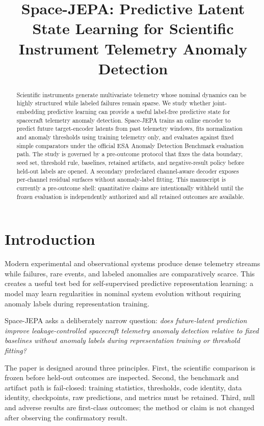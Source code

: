 \documentclass[conference]{IEEEtran}
\title{Space-JEPA: Predictive Latent State Learning for Scientific Instrument Telemetry Anomaly Detection}
\author{\IEEEauthorblockN{Anonymous Authors}}
\begin{document}
\maketitle

\begin{abstract}
Scientific instruments generate multivariate telemetry whose nominal dynamics can be highly structured while labeled failures remain sparse. We study whether joint-embedding predictive learning can provide a useful label-free predictive state for spacecraft telemetry anomaly detection. Space-JEPA trains an online encoder to predict future target-encoder latents from past telemetry windows, fits normalization and anomaly thresholds using training telemetry only, and evaluates against fixed simple comparators under the official ESA Anomaly Detection Benchmark evaluation path. The study is governed by a pre-outcome protocol that fixes the data boundary, seed set, threshold rule, baselines, retained artifacts, and negative-result policy before held-out labels are opened. A secondary predeclared channel-aware decoder exposes per-channel residual surfaces without anomaly-label fitting. This manuscript is currently a pre-outcome shell: quantitative claims are intentionally withheld until the frozen evaluation is independently authorized and all retained outcomes are available.
\end{abstract}

\section{Introduction}
Modern experimental and observational systems produce dense telemetry streams while failures, rare events, and labeled anomalies are comparatively scarce. This creates a useful test bed for self-supervised predictive representation learning: a model may learn regularities in nominal system evolution without requiring anomaly labels during representation training.

Space-JEPA asks a deliberately narrow question: \emph{does future-latent prediction improve leakage-controlled spacecraft telemetry anomaly detection relative to fixed baselines without anomaly labels during representation training or threshold fitting?}

The paper is designed around three principles. First, the scientific comparison is frozen before held-out outcomes are inspected. Second, the benchmark and artifact path is fail-closed: training statistics, thresholds, code identity, data identity, checkpoints, raw predictions, and metrics must be retained. Third, null and adverse results are first-class outcomes; the method or claim is not changed after observing the confirmatory result.
\end{document}
